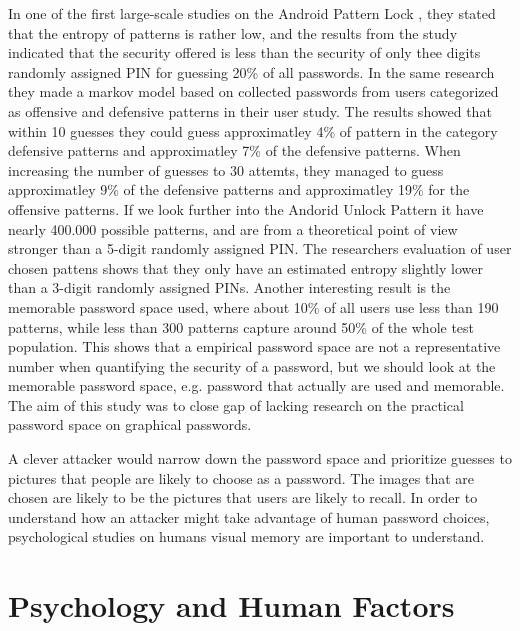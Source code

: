   In one of the first large-scale studies on the Android Pattern Lock \cite{Uellenbeck}, they stated that the entropy of patterns is rather low, and the results from the study indicated that the security offered is less than the security of only thee digits randomly assigned PIN for guessing 20\% of all passwords. In the same research they made a markov model based on collected passwords from users categorized as offensive and defensive patterns in their user study. The results showed that within 10 guesses they could guess approximatley 4\% of pattern in the category defensive patterns and approximatley 7\% of the defensive patterns. When increasing the number of guesses to 30 attemts, they managed to guess approximatley 9\% of the defensive patterns and approximatley 19\% for the offensive patterns. If we look further into the Andorid Unlock Pattern it have nearly 400.000 possible patterns, and are from a theoretical point of view stronger than a 5-digit randomly assigned PIN. The researchers evaluation of user chosen pattens shows that they only have an estimated entropy slightly lower than a 3-digit randomly assigned PINs. Another interesting result is the memorable password space used, where about 10\% of all users use less than 190 patterns, while less than 300 patterns capture around 50\% of the whole test population. This shows that a empirical password space are not a representative number when quantifying the security of a password, but we should look at the memorable password space, e.g. password that actually are used and memorable. The aim of this study was to close gap of lacking research on the practical password space on graphical passwords. 

  A clever attacker would narrow down the password space and prioritize guesses to pictures that people are likely to choose as a password. The images that are chosen are likely to be the pictures that users are likely to recall. In order to understand how an attacker might take advantage of human password choices, psychological studies on humans visual memory are important to understand. 

\section{Psychology and Human Factors}

